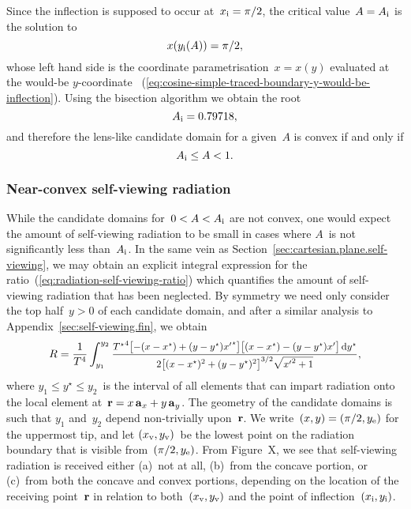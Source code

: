 Since the inflection is supposed to occur at~$x_{\mathrm{i}} = \pi/2$,
the critical value~$A = A_{\mathrm{i}}$ is the solution to
\begin{equation}
  x \roundbr[\bulkysize]{y_\infl (A)} = \pi/2,
  \label{eq:cosine-simple-traced-boundary-a-inflection-equation}
\end{equation}
whose left hand side is the coordinate parametrisation~$x = x (y)$
evaluated at the would-be $y$-coordinate~%
  (\ref{eq:cosine-simple-traced-boundary-y-would-be-inflection}).
Using the bisection algorithm we obtain the root
\begin{equation}
  A_{\mathrm{i}} = 0.79718,
  \label{eq:cosine-simple-traced-boundary-a-inflection}
\end{equation}
and therefore the lens-like candidate domain for a given~$A$ is convex
if and only if
\begin{equation}
  A_{\mathrm{i}} \le A < 1.
  \label{eq:cosine-simple-traced-boundary-convex-a-interval}
\end{equation}

\subsubsection{Near-convex self-viewing radiation}
\label{sec:cartesian.cosine.simple.self-viewing}

While the candidate domains for~$0 < A < A_{\mathrm{i}}$ are not convex,
one would expect the amount of self-viewing radiation to be small
in cases where $A$~is not significantly less than~$A_{\mathrm{i}}$.
In the same vein as Section~\ref{sec:cartesian.plane.self-viewing},
we may obtain an explicit integral expression
for the ratio~(\ref{eq:radiation-self-viewing-ratio})
which quantifies the amount of self-viewing radiation
that has been neglected.
By symmetry
we need only consider the top half~$y > 0$ of each candidate domain,
and after a similar analysis to Appendix~\ref{sec:self-viewing.fin},
we obtain
\begin{equation}
  \savecontent{
    R =
      \frac{1}{T^4}
      \int_{y_1}^{y_2}
        \smallerfrac{
          {T^\star}^4
          \squarebr[\big]{-(x - x^\star) + (y - y^\star) {x'}^\star}
          \squarebr[\big]{(x - x^\star) - (y - y^\star) x'}
          \td y^\star
        }{
          2
          \squarebr[\big]{(x - x^\star)^2 + (y - y^\star)^2}^{3/2}
          \sqrt{{x'}^2 + 1}
        }
  }{eq:cosine-simple-self-viewing-ratio},
\end{equation}
where $y_1 \le y^\star \le y_2$~is the interval of
all elements that can impart radiation
onto the local element at~$\boldsymbol{\mathbf{r}} = x \mathop{}\!\boldsymbol{\mathbf{a}}_{x} + y \mathop{}\!\boldsymbol{\mathbf{a}}_{y}$.
The geometry of the candidate domains is such that
$y_1$ and~$y_2$ depend non-trivially upon~$\boldsymbol{\mathbf{r}}$.
We write~$(x, y) = (\pi/2, y_{\mathrm{e}})$ for the uppermost tip,
and let $(x_{\mathrm{v}}, y_{\mathrm{v}})$~be the lowest point on the radiation boundary
that is visible from~$(\pi/2, y_{\mathrm{e}})$.
From Figure~X\@, %
we see that self-viewing radiation is received either
(a)~not at all,
(b)~from the concave portion, or
(c)~from both the concave and convex portions,
depending on the location of the receiving point~$\boldsymbol{\mathbf{r}}$
in relation to both~$(x_{\mathrm{v}}, y_{\mathrm{v}})$
and the point of inflection~$(x_{\mathrm{i}}, y_{\mathrm{i}})$.

